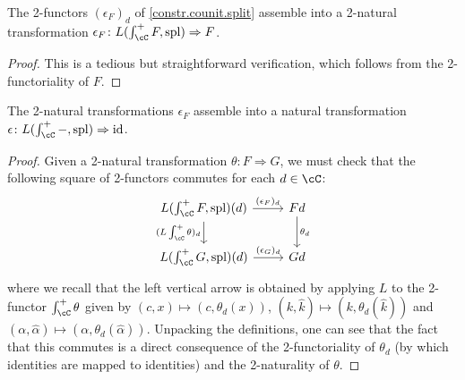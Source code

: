 \documentclass[11pt, dvipsnames]{amsart}
\begin{document}
\begin{lem}
    The 2-functors $(\epsilon_F)_d$ of \cref{constr.counit.split} assemble into a 2-natural transformation $\epsilon_F\colon L(\int_\cC^+ F,\mathrm{spl})\Rightarrow F$.
\end{lem}
\begin{proof}
    This is a tedious but straightforward verification, which follows from the 2-functoriality of $F$.
\end{proof}

\begin{lem}
    The 2-natural transformations $\epsilon_F$ assemble into a natural transformation $\epsilon\colon L(\int_\cC^+ -,\mathrm{spl})\Rightarrow \id$.
\end{lem}
\begin{proof}
    Given a 2-natural transformation $\theta\colon F\Rightarrow G$, we must check that the following square of 2-functors commutes for each $d\in\cC$:
    \[\begin{tikzcd}
        L(\int_\cC^+ F,\mathrm{spl})(d)\rar["{(\epsilon_F)_d}"] \dar["{(L\int_\cC^+\theta)_d}"'] & Fd\dar["\theta_d"]\\
        L(\int_\cC^+ G,\mathrm{spl})(d)\rar["{(\epsilon_G)_d}"] & Gd
    \end{tikzcd}\] where we recall that the left vertical arrow is obtained by applying $L$ to the 2-functor $\int_\cC^+\theta$ given by $(c,x)\mapsto (c,\theta_d(x))$, $(k,\widehat{k})\mapsto (k,\theta_d(\widehat{k}))$ and $(\alpha,\widehat{\alpha})\mapsto (\alpha,\theta_d(\widehat{\alpha}))$. Unpacking the definitions, one can see that the fact that this commutes is a direct consequence of the 2-functoriality of $\theta_d$ (by which identities are mapped to identities) and the 2-naturality of $\theta$. 
\end{proof}
\end{document}
